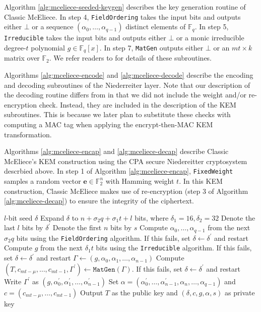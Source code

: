 \documentclass[runningheads]{llncs}
\begin{document}
Algorithm \ref{alg:mceliece-seeded-keygen} describes the key generation routine of Classic McEliece. In step 4, \texttt{FieldOrdering} takes the input bits and outputs either $\bot$ or a sequence $(\alpha_0, \ldots, \alpha_{q-1})$ distinct elements of $\mathbb{F}_q$. In step 5, \texttt{Irreducible}  takes the input bits and outputs either $\bot$ or a monic irreducible degree-$t$ polynomial $g \in \mathbb{F}_q[x]$. In step 7, \texttt{MatGen} outputs either $\bot$ or an $mt \times k$ matrix over $\mathbb{F}_2$. We refer readers to \cite{ClassicMcEliece2022} for details of these subroutines.

Algorithms \ref{alg:mceliece-encode} and \ref{alg:mceliece-decode} describe the encoding and decoding subroutines of the Niederreiter layer. Note that our description of the decoding routine differs from \cite{ClassicMcEliece2022} in that we did not include the weight and/or re-encryption check. Instead, they are included in the description of the KEM subroutines. This is because we later plan to substitute these checks with computing a MAC tag when applying the encrypt-then-MAC KEM transformation.

Algorithms \ref{alg:mceliece-encap} and \ref{alg:mceliece-decap} describe Classic McEliece's KEM construction using the CPA secure Niedereitter cryptosystem descrbied above. In step 1 of Algorithm \ref{alg:mceliece-encap}, \texttt{FixedWeight} samples a random vector $\mathbf{e}\in\mathbb{F}_2^n$ with Hamming weight $t$. In this KEM construction, Classic McEliece makes use of re-encryption (step 3 of Algorithm \ref{alg:mceliece-decap}) to ensure the integrity of the ciphertext.

\begin{algorithm}
    \caption{$\texttt{SeededKeyGen}(\delta)$}\label{alg:mceliece-seeded-keygen}
    \begin{algorithmic}[1]
        \Require $l$-bit seed $\delta$
        \State Expand $\delta$ to $n + \sigma_2 q + \sigma_1 t + l$ bits, where $\delta_1 = 16, \delta_2 = 32$
        \State Denote the last $l$ bits by $\delta^\prime$
        \State Denote the first $n$ bits by $s$
        \State Compute $\alpha_0, \ldots, \alpha_{q-1}$ from the next $\sigma_2 q$ bits using the \texttt{FieldOrdering} algorithm. If this fails, set $\delta \leftarrow \delta^\prime$ and restart
        \State Compute $g$ from the next $\delta_1 t$ bits using the \texttt{Irreducible} algorithm. If this fails, set $\delta \leftarrow \delta^\prime$ and restart
        \State $\Gamma \leftarrow (g, \alpha_0, \alpha_1, \ldots, \alpha_{n-1})$
        \State Compute $(T, c_{mt-\mu}, \ldots, c_{mt-1}, \Gamma^\prime) \leftarrow \texttt{MatGen}(\Gamma)$. If this fails, set $\delta \leftarrow \delta^\prime$ and restart
        \State Write $\Gamma^\prime$ as $(g, \alpha_0^\prime, \alpha_1^\prime, \ldots, \alpha_{n-1}^\prime)$
        \State Set $\alpha = (\alpha_0^\prime, \ldots, \alpha_{n-1}^\prime, \alpha_n, \ldots, \alpha_{q-1})$ and $c = (c_{mt-\mu}, \ldots, c_{mt-1})$
        \State Output $T$ as the public key and $(\delta, c, g, \alpha, s)$ as private key
    \end{algorithmic}
\end{algorithm}
\end{document}
